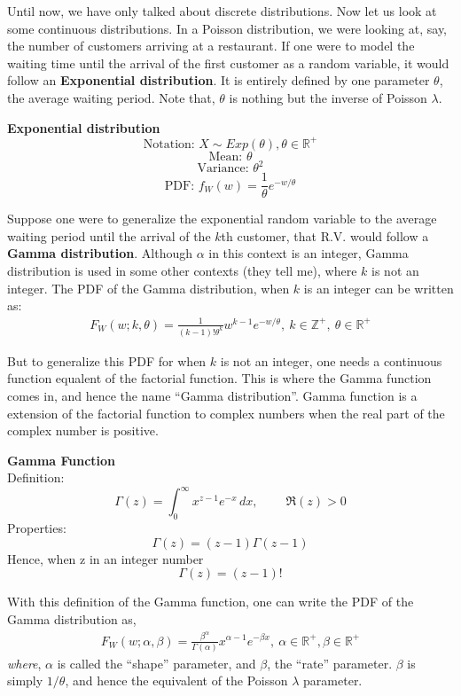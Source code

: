 Until now, we have only talked about discrete distributions. Now let us look at some continuous distributions. In a Poisson distribution, we were looking at, say, the number of customers arriving at a restaurant. If one were to model the waiting time until the arrival of the first customer as a random variable, it would follow an \textbf{Exponential distribution}. It is entirely defined by one parameter $\theta$, the average waiting period. Note that, $\theta$ is nothing but the inverse of Poisson $\lambda$. 

	\begin{highlightedText}
		\textbf{Exponential  distribution} 
		\[ \text{Notation: }  X \sim Exp(\theta), \theta \in \mathbb{R}^+ \] 			
		\[ \text{Mean: } \theta \] 						
		\[ \text{Variance: } \theta^2 \] 						
		\[ \text{PDF: } f_W(w) =  \frac{1}{\theta}e^{-w/\theta} \] 
	\end{highlightedText}

Suppose one were to generalize the exponential random variable to the average waiting period until the arrival of the $k$th customer, that R.V. would follow a \textbf{Gamma distribution}. Although $\alpha$ in this context is an integer, Gamma distribution is used in some other contexts (they tell me), where $k$ is not an integer. The PDF of the Gamma distribution, when $k$ is an integer can be written as:
	\begin{align*}
		F_W(w;k,\theta) = \frac{1}{(k-1)! \theta^k} w^{k - 1} e^{-w/\theta},\ k \in \mathbb{Z}^+,\ \theta \in \mathbb{R}^+
	\end{align*}

But to generalize this PDF for when $k$ is not an integer, one needs a continuous function equalent of the factorial function. This is where the Gamma function comes in, and hence the name ``Gamma distribution''. Gamma function is a extension of the factorial function to complex numbers when the real part of the complex number is positive. 
	\begin{highlightedText}
	\textbf{Gamma Function} \\
	Definition: 
	\[ \Gamma(z) = \int_0^\infty x^{z-1} e^{-x}\,dx, \ \qquad \Re(z) > 0 \]
	Properties: 
	\[ \Gamma(z) = (z-1)\Gamma(z-1) \]
	Hence, when z in an integer number
	\[ \Gamma(z) = (z-1)! \]
	\end{highlightedText}

With this definition of the Gamma function, one can write the PDF of the Gamma distribution as, 
	\begin{align*}
	F_W(w;\alpha,\beta) = \frac{\beta^\alpha}{\Gamma(\alpha)} x^{\alpha - 1} e^{-\beta x},\ \alpha \in \mathbb{R}^+, \beta \in \mathbb{R}^+ 
	\end{align*}
\emph{where}, $\alpha$ is called the ``shape'' parameter, and $\beta$, the ``rate'' parameter. $\beta$ is simply $1/\theta$, and hence the equivalent of the Poisson $\lambda$ parameter.

